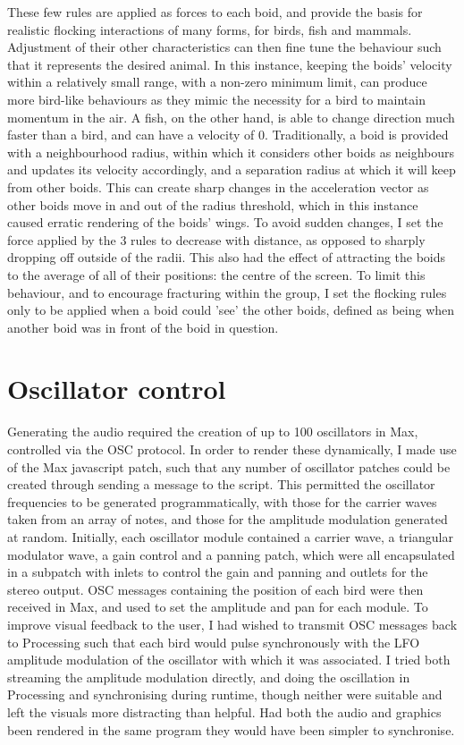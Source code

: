\documentclass[journal, a4paper]{IEEEtran}
\begin{document}
These few rules are applied as forces to each boid, and provide the basis for realistic flocking interactions of many forms, for birds, fish and mammals. Adjustment of their other characteristics can then fine tune the behaviour such that it represents the desired animal. In this instance, keeping the boids' velocity within a relatively small range, with a non-zero minimum limit, can produce more bird-like behaviours as they mimic the necessity for a bird to maintain momentum in the air. A fish, on the other hand, is able to change direction much faster than a bird, and can have a velocity of 0.
Traditionally, a boid is provided with a neighbourhood radius, within which it considers other boids as neighbours and updates its velocity accordingly, and a separation radius at which it will keep from other boids. This can create sharp changes in the acceleration vector as other boids move in and out of the radius threshold, which in this instance caused erratic rendering of the boids' wings. To avoid sudden changes, I set the force applied by the 3 rules to decrease with distance, as opposed to sharply dropping off outside of the radii. This also had the effect of attracting the boids to the average of all of their positions: the centre of the screen. To limit this behaviour, and to encourage fracturing within the group, I set the flocking rules only to be applied when a boid could 'see' the other boids, defined as being when another boid was in front of the boid in question.

\section*{Oscillator control}
Generating the audio required the creation of up to 100 oscillators in Max, controlled via the OSC protocol. In order to render these dynamically, I made use of the Max javascript patch, such that any number of oscillator patches could be created through sending a message to the script. This permitted the oscillator frequencies to be generated programmatically, with those for the carrier waves taken from an array of notes, and those for the amplitude modulation generated at random. Initially, each oscillator module contained a carrier wave, a triangular modulator wave, a gain control and a panning patch, which were all encapsulated in a subpatch with inlets to control the gain and panning and outlets for the stereo output. OSC messages containing the position of each bird were then received in Max, and used to set the amplitude and pan for each module.
To improve visual feedback to the user, I had wished to transmit OSC messages back to Processing such that each bird would pulse synchronously with the LFO amplitude modulation of the oscillator with which it was associated. I tried both streaming the amplitude modulation directly, and doing the oscillation in Processing and synchronising during runtime, though neither were suitable and left the visuals more distracting than helpful. Had both the audio and graphics been rendered in the same program they would have been simpler to synchronise.
\end{document}
